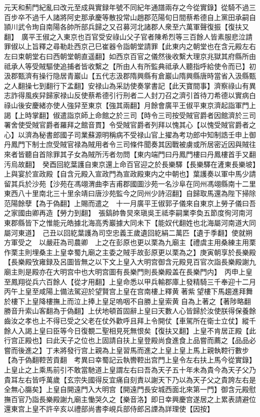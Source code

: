 元天和薊門紀亂曰改元至成與實録年號不同紀年通譜兩存之今從實錄】從騎不過三百步卒不過千人諸將阿史那承慶等散投常山趙郡范陽旬日間蔡希德自上黨田承嗣自頴川武令珣自南陽各帥所部兵歸之又召募河北諸郡人衆至六萬軍聲復振【復扶又翻】　廣平王俶之入東京也百官受安祿山父子官者陳希烈等三百餘人皆素服悲泣請罪俶以上旨釋之尋勒赴西京己巳崔器令詣朝堂請罪【此東内之朝堂也在含元殿左右左曰束朝堂右曰西朝堂朝直遥翻】如西京百官之儀然後收繫大理京兆獄其府縣所由祗承人等受賊驅使追捕者皆收繫之【所由人有所監典祗承人聽指呼給使令而已】初汲郡甄濟有操行隐居青巖山【五代志汲郡隋興縣有倉巖山隋興縣唐時當省入汲縣甄之人翻操七到翻行下孟翻】安禄山為采訪使奏掌書記【此天寶間事】濟察祿山有異志詐得風疾舁歸家禄山反使蔡希德引行刑者二人封刀召之濟引首待刀希德以實病白祿山後安慶緒亦使人強舁至東京【強其兩翻】月餘會廣平王俶平東京濟起詣軍門上謁【上時掌翻】俶遣詣京師上命館之於三司【時令三司按受賊官爵者因館濟於三司署舍使受賊官爵者羅拜之館音貫】令受賊官爵者列拜以愧其心【以愧受賊官爵者之心】以濟為秘書郎國子司業蘇源明稱病不受禄山官上擢為考功郎中知制誥壬申上御丹鳳門下制士庶受賊官禄為賊用者令三司條件聞奏其因戰被虜或所居密近因與賊往來者皆聽自首除罪其子女為賊所汚者勿問【東内端門曰丹鳳門樓曰丹鳳樓首手又翻汚烏故翻】　癸酉回紇葉護自東京還上命百官迎之於長樂驛【長樂驛在滻東長樂坡】上與宴於宣政殿【自含元殿入宣政門為宣政殿東内之中朝也】葉護奏以軍中馬少請留其兵於沙苑【沙苑在馮翊渭曲李吉甫郡國圖沙苑一名沙阜在同州馮翊縣南十二里東西八十里南北三十里余靖曰唐沙苑監今之同州少詩沼翻】自歸取馬還為陛下掃除范陽餘孽【為于偽翻】上賜而遣之　十一月廣平王俶郭子儀來自東京上勞子儀曰吾之家國由卿再造【勞力到翻】　張鎬帥魯炅來瑱吳王祗李嗣業李奐五節度徇河南河東郡縣皆下之惟能元皓據北海高秀巖據大同未下【能奴代翻姓也北海屬河南道大同屬河東道】　己丑以回紇葉護為司空忠義王歲遺回紇絹二萬匹【遺于季翻】使就朔方軍受之　以嚴莊為司農卿　上之在彭原也更以栗為九廟主【禮虞主用桑練主用栗作栗主則埋桑主上皇幸蜀九廟之主委之賊手故彭原更以栗為之】庚寅朝享於長樂殿【長樂殿攷雍録及呂圖皆無之以下文上皇入大明宫御含元殿見百官次詣長樂殿謝九廟主則是殿亦在大明宫中也大明宫圖有長樂門則長樂殿盖在長樂門内】　丙申上皇至鳳翔從兵六百餘人【從才用翻】上皇命悉以甲兵輸郡庫上發精騎三千奉迎十二月丙午上皇至咸陽上備法駕迎於望賢宫上皇在宫南樓上釋黄著紫望樓下馬趨進拜舞於樓下上皇降樓撫上而泣上捧上皇足嗚咽不自勝上皇索黄自為上著之【著陟略翻勝音升索山客翻為于偽翻】上伏地頓首固辭上皇曰天數人心皆歸於汝使朕得保養餘齒汝之孝也上不得已受之父老在仗外歡呼且拜上令開仗【車駕所在衛士立仗】縱千餘人入謁上皇曰臣等今日復覩二聖相見死無恨矣【復扶又翻】上皇不肯居正殿【此行宫正殿也】曰此天子之位也上固請自扶上皇登殿尚食進食上品嘗而薦之【品品必嘗而後進之】丁未將發行宫上親為上皇習馬而進之上皇上皇上馬上親執鞚行數步【為于偽翻鞚苦貢翻　考異曰幸蜀記云執轡鞚出宫門上皇令左右扶上馬今從實錄】上皇止之上乘馬前引不敢當馳道上皇謂左右曰吾為天子五十年未為貴今為天子父乃貴耳左右皆呼萬歲【玄宗失國得反宜痛自刻責以謝天下乃以為天子父之貴誇左右是全無心膓矣】上皇自開遠門入大明宫【開遠門長安城西面北來第一門】御含元殿慰撫百官乃詣長樂殿謝九廟主慟哭久之【樂音洛】即日幸興慶宫遂居之上累表請避位還東宫上皇不許辛亥以禮部尚書李峴兵部侍郎呂諲為詳理使【因按】

